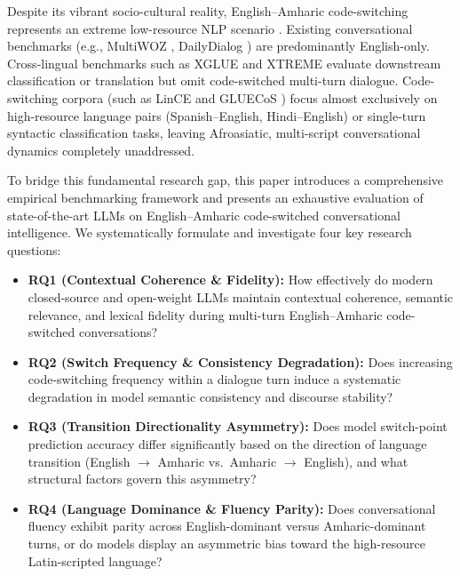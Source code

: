 \documentclass[11pt,a4paper]{article}
\begin{document}
Despite its vibrant socio-cultural reality, English--Amharic code-switching represents an extreme low-resource NLP scenario \cite{adebara2022african, tonja2023ethiopian}. Existing conversational benchmarks (e.g., MultiWOZ \cite{budzianowski2018multiwoz}, DailyDialog \cite{li2017dailydialog}) are predominantly English-only. Cross-lingual benchmarks such as XGLUE \cite{liang2020xglue} and XTREME \cite{hu2020xtreme} evaluate downstream classification or translation but omit code-switched multi-turn dialogue. Code-switching corpora (such as LinCE \cite{aguilar2020lince} and GLUECoS \cite{khanuja2020gluecos}) focus almost exclusively on high-resource language pairs (Spanish--English, Hindi--English) or single-turn syntactic classification tasks, leaving Afroasiatic, multi-script conversational dynamics completely unaddressed.

To bridge this fundamental research gap, this paper introduces a comprehensive empirical benchmarking framework and presents an exhaustive evaluation of state-of-the-art LLMs on English--Amharic code-switched conversational intelligence. We systematically formulate and investigate four key research questions:
\begin{itemize}
    \item \textbf{RQ1 (Contextual Coherence \& Fidelity):} How effectively do modern closed-source and open-weight LLMs maintain contextual coherence, semantic relevance, and lexical fidelity during multi-turn English--Amharic code-switched conversations?
    \item \textbf{RQ2 (Switch Frequency \& Consistency Degradation):} Does increasing code-switching frequency within a dialogue turn induce a systematic degradation in model semantic consistency and discourse stability?
    \item \textbf{RQ3 (Transition Directionality Asymmetry):} Does model switch-point prediction accuracy differ significantly based on the direction of language transition (English $\rightarrow$ Amharic vs.\ Amharic $\rightarrow$ English), and what structural factors govern this asymmetry?
    \item \textbf{RQ4 (Language Dominance \& Fluency Parity):} Does conversational fluency exhibit parity across English-dominant versus Amharic-dominant turns, or do models display an asymmetric bias toward the high-resource Latin-scripted language?
\end{itemize}
\end{document}

